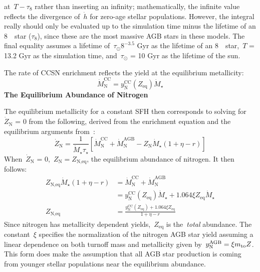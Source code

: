 \documentclass[\main/notes.tex]{subfiles}
\begin{document}
at~$T - \tau_8$ rather than inserting an infinity; mathematically, the infinite 
value reflects the divergence of~$\dot{h}$ for zero-age stellar populations. 
However, the integral really should only be evaluated up to the simulation time 
minus the lifetime of an 8~\msun~star ($\tau_8$), since these are the most 
massive AGB stars in these models. 
The final equality assumes a lifetime of~$\tau_\odot8^{-3.5}$ Gyr as the 
lifetime of an 8~\msun~star,~$T$ = 13.2 Gyr as the simulation time, 
and~$\tau_\odot$ = 10 Gyr as the lifetime of the sun. 
\par 
The rate of CCSN enrichment reflects the yield at the equilibrium metallicity: 
\begin{equation} 
\dot{M}_\text{N}^\text{CC} = y_\text{N}^\text{CC}(Z_\text{eq})\dot{M}_\star 
\end{equation} 
\twolineskip 
\textbf{The Equilibrium Abundance of Nitrogen} 
\par\noindent 
The equilibrium metallicity for a constant SFH then corresponds to solving 
for~$\dot{Z}_\text{N}$ = 0 from the following, derived from the enrichment 
equation and the equilibrium arguments from~\citet*{Weinberg2017}: 
\begin{equation} 
\dot{Z}_\text{N} = \frac{1}{\dot{M}_\star\tau_\star} 
\left[\dot{M}_\text{N}^\text{CC} + \dot{M}_\text{N}^\text{AGB} - Z_\text{N} 
\dot{M}_\star(1 + \eta - r)\right] 
\end{equation} 
When~$\dot{Z}_\text{N}$ = 0,~$Z_\text{N} = Z_\text{N,eq}$, the equilibrium 
abundance of nitrogen. It then follows: 
\begin{subequations}\begin{align} 
Z_\text{N,eq}\dot{M}_\star(1 + \eta - r) &= 
\dot{M}_\text{N}^\text{CC} + \dot{M}_\text{N}^\text{AGB} 
\\ 
&= y_\text{N}^\text{CC}(Z_\text{eq})\dot{M}_\star + 1.064\xi Z_\text{eq} 
\dot{M}_\star 
\\ 
Z_\text{N,eq} &= \frac{
	y_\text{N}^\text{CC}(Z_\text{eq}) + 1.064\xi Z_\text{eq} 
}{
	1 + \eta - r 
}
\end{align}\end{subequations} 
Since nitrogen has metallicity dependent yields,~$Z_\text{eq}$ is 
the~\textit{total} abundance. 
The constant~$\xi$ specifies the normalization of the nitrogen AGB star yield 
assuming a linear dependence on both turnoff mass and metallicity given 
by~$y_\text{N}^\text{AGB} = \xi m_\text{to} Z$. 
This form does make the assumption that all AGB star production is coming from 
younger stellar populations near the equilibrium abundance. 
\end{document}
